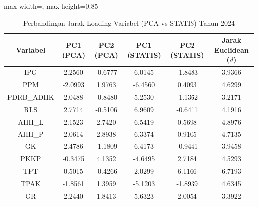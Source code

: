 \begin{table}[H]
\centering
\caption{Perbandingan Jarak Loading Variabel (PCA vs STATIS) Tahun 2024} \label{tab:app1jarak_loading_2024}
\begin{adjustbox}{max width=\textwidth, max height=0.85\textheight}
\begin{tabular}{|c|c|c|c|c|c|}
\hline
\textbf{Variabel} & \textbf{PC1 (PCA)} & \textbf{PC2 (PCA)} & \textbf{PC1 (STATIS)} & \textbf{PC2 (STATIS)} & \textbf{Jarak Euclidean ($d$)} \\
\hline
IPG & 2.2560 & -0.6777 & 6.0145 & -1.8483 & 3.9366 \\
PPM & -2.0993 & 1.9763 & -6.4560 & 0.4093 & 4.6299 \\
PDRB\_ADHK & 2.0488 & -0.8480 & 5.2530 & -1.1362 & 3.2171 \\
RLS & 2.7714 & -0.5106 & 6.9609 & -0.6411 & 4.1916 \\
AHH\_L & 2.1523 & 2.7420 & 6.5419 & 0.5698 & 4.8976 \\
AHH\_P & 2.0614 & 2.8938 & 6.3374 & 0.9105 & 4.7135 \\
GK & 2.4786 & -1.1809 & 6.4173 & -0.9441 & 3.9458 \\
PKKP & -0.3475 & 4.1352 & -4.6495 & 2.7184 & 4.5293 \\
TPT & 0.5015 & -0.4266 & 2.0299 & 6.1166 & 6.7193 \\
TPAK & -1.8561 & 1.3959 & -5.1203 & -1.8939 & 4.6345 \\
GR & 2.2440 & 1.8413 & 5.6323 & 2.0054 & 3.3922 \\
\hline
\end{tabular}
\end{adjustbox}
\end{table}